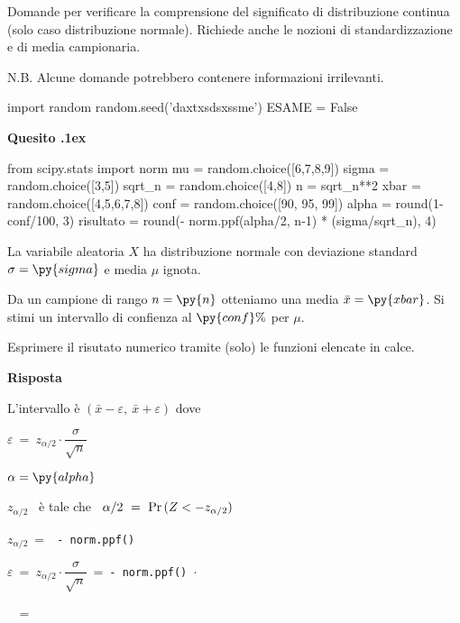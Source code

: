 \documentclass[11pt,twoside,a4paper]{article}
\def\Pr{{\rm Pr\,}}
\newcounter{quesito}
\newenvironment{question}{\addtocounter{quesito}{1}\bigskip\bigskip\par\textbf{Quesito \thequesito.\kern1ex}}{\vspace{\parskip}}
\newenvironment{answer}{\par\textbf{Risposta\quad}}{\vspace{\parskip}}
\begin{document}
\colorbox{blue!10}{\begin{minipage}{\textwidth}
Domande per verificare la comprensione del significato di distribuzione continua (solo caso distribuzione normale). Richiede anche le nozioni di standardizzazione e di media campionaria.\medskip

N.B. Alcune domande potrebbero contenere informazioni irrilevanti.
\end{minipage}}
\bigskip\bigskip


\begin{pycode}
import random
random.seed('daxtxsdsxssme')
ESAME = False
\end{pycode}
\begin{question}
\begin{pycode}
from scipy.stats import norm
mu = random.choice([6,7,8,9])
sigma = random.choice([3,5])
sqrt_n = random.choice([4,8])
n = sqrt_n**2
xbar =  random.choice([4,5,6,7,8])
conf = random.choice([90, 95, 99])
alpha = round(1-conf/100, 3)
risultato = round(- norm.ppf(alpha/2, n-1) * (sigma/sqrt_n), 4)
\end{pycode}
La variabile aleatoria $X$ ha distribuzione normale con deviazione standard $\sigma=\py{sigma}$ e media $\mu$ ignota.

Da un campione di rango $n=\py{n}$ otteniamo una media $\bar x=\py{xbar}$. Si stimi un intervallo di confienza al $\py{conf}\%$ per $\mu$.

Esprimere il risutato numerico tramite (solo) le funzioni elencate in calce.
\begin{answer}


L'intervallo è $(\bar x-\varepsilon,\ \bar x+\varepsilon)$ dove

$\varepsilon\ =\ z_{\alpha/2}\cdot\dfrac{\sigma}{\sqrt{n}}$ 

$\alpha = \py{alpha}$

$z_{\alpha/2}$ \ è tale che \ $\alpha/2\ =\ \Pr(Z<-z_{\alpha/2})$

$z_{\alpha/2}\ =\ $\ {\tt - norm.ppf()}

$\varepsilon\ =\ z_{\alpha/2}\cdot\dfrac{\sigma}{\sqrt{n}}\ =\ ${\color{blue}\tt - norm.ppf() $\cdot$ }

$\phantom{\varepsilon}$\ =\ {\tt {}}
\end{answer}
\end{question}
\end{document}
